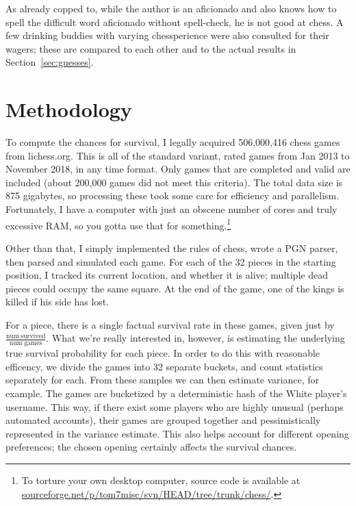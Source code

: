 \documentclass[twocolumn]{article}
\begin{document}
As already copped to, while the author is an aficionado and also knows
how to spell the difficult word aficionado without spell-check, he is
not good at chess. A few drinking buddies with varying chessperience
were also consulted for their wagers; these are compared to each other
and to the actual results in Section~\ref{sec:guesses}.


\section{Methodology}

To compute the chances for survival, I legally acquired 506,000,416
chess games from lichess.org. This is all of the standard variant,
rated games from Jan 2013 to November 2018, in any time format. Only
games that are completed and valid are included (about 200,000 games
did not meet this criteria). The total data size is 875 gigabytes, so
processing these took some care for efficiency and parallelism.
Fortunately, I have a computer with just an obscene number of cores
and truly excessive RAM, so you gotta use that for
something.\footnote{ To torture your own desktop computer, source code
  is available at
  \url{sourceforge.net/p/tom7misc/svn/HEAD/tree/trunk/chess/}.}

Other than that, I simply implemented the rules of chess, wrote a PGN
parser, then parsed and simulated each game. For each
of the 32 pieces in the starting position, I tracked its current
location, and whether it is alive; multiple dead pieces could
occupy the same square. At the end of the game, one of the kings is
killed if his side has lost.

For a piece, there is a single factual survival rate in these games,
given just by $\frac{\mathrm{num~survived}}{\mathrm{num~games}}$. What
we're really interested in, however, is estimating the underlying true
survival probability for each piece. In order to do this with
reasonable efficency, we divide the games into 32 separate buckets,
and count statistics separately for each. From these samples we can
then estimate variance, for example. The games are bucketized by a
deterministic hash of the White player's username. This way, if there
exist some players who are highly unusual (perhaps automated
accounts), their games are grouped together and pessimistically
represented in the variance estimate. This also helps account for
different opening preferences; the chosen opening certainly affects
the survival chances.
\end{document}
